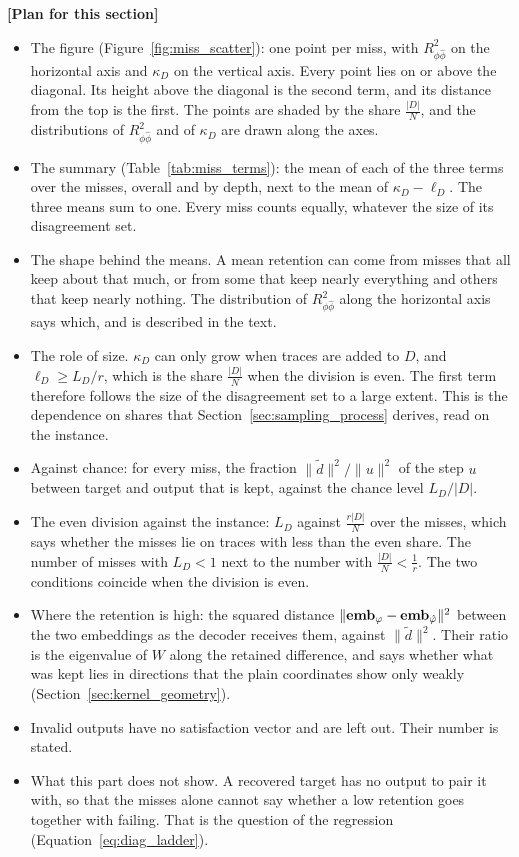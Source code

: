 \documentclass[titlepage,a4paper,11pt]{report}
\newenvironment{RSplan}{\par\medskip\color{orange!85!black}\noindent\textbf{[Plan for this section]}\par}{\par\medskip}
\begin{document}
\begin{RSplan}
\begin{itemize}
        \item The figure (Figure~\ref{fig:miss_scatter}): one point per miss, with $R^2_{\phi\hat\phi}$ on the horizontal axis and $\kappa_D$ on the vertical axis. Every point lies on or above the diagonal. Its height above the diagonal is the second term, and its distance from the top is the first. The points are shaded by the share $\frac{|D|}{N}$, and the distributions of $R^2_{\phi\hat\phi}$ and of $\kappa_D$ are drawn along the axes.
        \item The summary (Table~\ref{tab:miss_terms}): the mean of each of the three terms over the misses, overall and by depth, next to the mean of $\kappa_D-\ell_D$. The three means sum to one. Every miss counts equally, whatever the size of its disagreement set.
        \item The shape behind the means. A mean retention can come from misses that all keep about that much, or from some that keep nearly everything and others that keep nearly nothing. The distribution of $R^2_{\phi\hat\phi}$ along the horizontal axis says which, and is described in the text.
        \item The role of size. $\kappa_D$ can only grow when traces are added to $D$, and $\ell_D\ge L_D/r$, which is the share $\frac{|D|}{N}$ when the division is even. The first term therefore follows the size of the disagreement set to a large extent. This is the dependence on shares that Section~\ref{sec:sampling_process} derives, read on the instance.
        \item Against chance: for every miss, the fraction $\lVert\tilde d\rVert^2/\lVert u\rVert^2$ of the step $u$ between target and output that is kept, against the chance level $L_D/|D|$.
        \item The even division against the instance: $L_D$ against $\frac{r|D|}{N}$ over the misses, which says whether the misses lie on traces with less than the even share. The number of misses with $L_D<1$ next to the number with $\frac{|D|}{N}<\frac1r$. The two conditions coincide when the division is even.
        \item Where the retention is high: the squared distance $\lVert\textbf{emb}_\varphi-\textbf{emb}_{\hat{\varphi}}\rVert^2$ between the two embeddings as the decoder receives them, against $\lVert\tilde d\rVert^2$. Their ratio is the eigenvalue of $W$ along the retained difference, and says whether what was kept lies in directions that the plain coordinates show only weakly (Section~\ref{sec:kernel_geometry}).
        \item Invalid outputs have no satisfaction vector and are left out. Their number is stated.
        \item What this part does not show. A recovered target has no output to pair it with, so that the misses alone cannot say whether a low retention goes together with failing. That is the question of the regression (Equation~\eqref{eq:diag_ladder}).
    \end{itemize}
    \end{RSplan}
\end{document}
